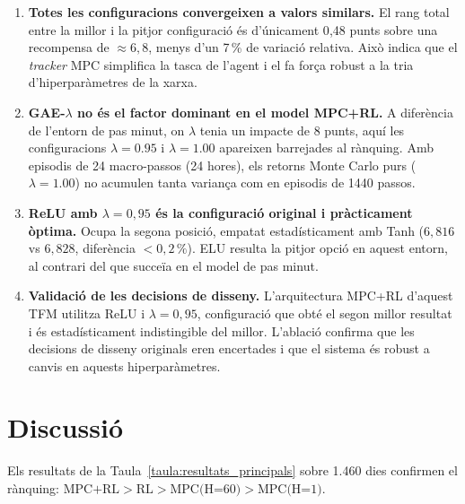 \documentclass[a4paper,12pt,twoside]{ThesisStyle}
\begin{document}
\begin{enumerate}
    \item \textbf{Totes les configuracions convergeixen a valors similars.} El rang total entre la millor i la pitjor configuració és d'únicament 0{,}48 punts sobre una recompensa de $\approx 6{,}8$, menys d'un 7\,\% de variació relativa. Això indica que el \textit{tracker} MPC simplifica la tasca de l'agent i el fa força robust a la tria d'hiperparàmetres de la xarxa.

    \item \textbf{GAE-$\lambda$ no és el factor dominant en el model MPC+RL.} A diferència de l'entorn de pas minut, on $\lambda$ tenia un impacte de 8 punts, aquí les configuracions $\lambda=0.95$ i $\lambda=1.00$ apareixen barrejades al rànquing. Amb episodis de 24 macro-passos (24 hores), els retorns Monte Carlo purs ($\lambda=1.00$) no acumulen tanta variança com en episodis de 1440 passos.

    \item \textbf{ReLU amb $\lambda=0{,}95$ és la configuració original i pràcticament òptima.} Ocupa la segona posició, empatat estadísticament amb Tanh ($6{,}816$ vs $6{,}828$, diferència $<0{,}2\,\%$). ELU resulta la pitjor opció en aquest entorn, al contrari del que succeïa en el model de pas minut.

    \item \textbf{Validació de les decisions de disseny.} L'arquitectura MPC+RL d'aquest TFM utilitza ReLU i $\lambda=0{,}95$, configuració que obté el segon millor resultat i és estadísticament indistingible del millor. L'ablació confirma que les decisions de disseny originals eren encertades i que el sistema és robust a canvis en aquests hiperparàmetres.
\end{enumerate}

\section{Discussió}

Els resultats de la Taula~\ref{taula:resultats_principals} sobre 1.460 dies confirmen el rànquing: $\text{MPC+RL} > \text{RL} > \text{MPC(H=60)} > \text{MPC(H=1)}$.
\end{document}
